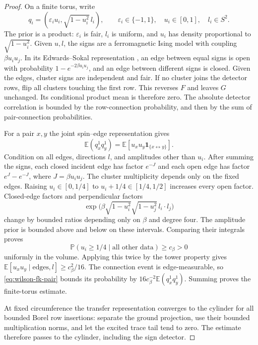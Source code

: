 \begin{proof}
On a finite torus, write
\[
 q_i=(\varepsilon_i u_i,\sqrt{1-u_i^2}\,l_i),\qquad
 \varepsilon_i\in\{-1,1\},\quad u_i\in[0,1],\quad l_i\in S^2.
\]
The prior is a product: $\varepsilon_i$ is fair, $l_i$ is
uniform, and $u_i$ has density proportional to $\sqrt{1-u_i^2}$.
Given $u,l$, the signs are a ferromagnetic Ising model with
coupling $\beta u_i u_j$. In its Edwards--Sokal representation
\cite{EdwardsSokal1988}, an edge between equal signs is open
with probability $1-e^{-2\beta u_i u_j}$, and an edge between
different signs is closed. Given the edges, cluster signs
are independent and fair. If no cluster
joins the detector rows, flip all clusters touching the first
row. This reverses $F$ and leaves $G$ unchanged. Its conditional
product mean is therefore zero. The absolute detector
correlation is bounded by the row-connection probability,
and then by the sum of pair-connection probabilities.

For a pair $x,y$ the joint spin--edge representation gives
\begin{equation}
 \mathbb E(q_x^1q_y^1)
 =\mathbb E[u_xu_y\mathbf1_{\{x\leftrightarrow y\}}].
 \label{eq:wilson-fk-pair}
\end{equation}
Condition on all edges, directions $l$, and amplitudes other
than $u_i$. After summing the signs, each closed incident edge
has factor $e^{-J}$ and each open edge has factor $e^J-e^{-J}$,
where $J=\beta u_i u_j$. The cluster multiplicity depends only
on the fixed edges. Raising $u_i\in[0,1/4]$ to
$u_i+1/4\in[1/4,1/2]$ increases every open factor. Closed-edge
factors and perpendicular factors
\[
 \exp\bigl(\beta\sqrt{1-u_i^2}\sqrt{1-u_j^2}\,l_i\cdot l_j\bigr)
\]
change by bounded ratios depending only on $\beta$ and degree
four. The amplitude prior is bounded above and below on these
intervals. Comparing their integrals proves
\[
 \mathbb P(u_i\ge1/4\mid\text{all other data})\ge c_\beta>0
\]
uniformly in the volume. Applying this twice by the tower
property gives
$\mathbb E[u_xu_y\mid\text{edges},l]\ge c_\beta^2/16$.
The connection event is edge-measurable, so
\eqref{eq:wilson-fk-pair} bounds its probability by
$16c_\beta^{-2}\mathbb E(q_x^1q_y^1)$. Summing proves the
finite-torus estimate.

At fixed circumference the transfer representation converges
to the cylinder for all bounded Borel row insertions: separate
the ground projection, use their bounded multiplication norms,
and let the excited trace tail tend to zero. The estimate
therefore passes to the cylinder, including the sign detector.
\end{proof}

